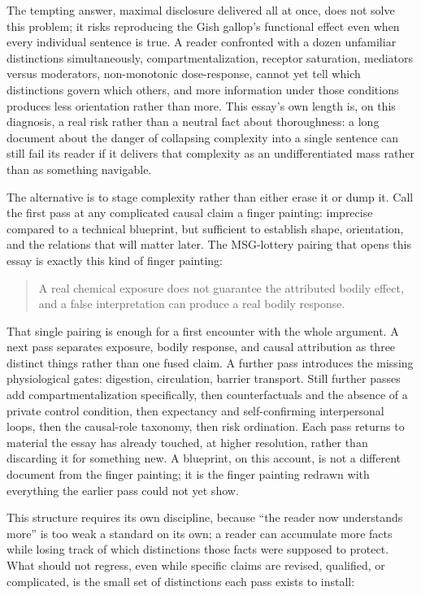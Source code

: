 \documentclass[11pt]{article}
\begin{document}
The tempting answer, maximal disclosure delivered all at once, does not solve this problem; it risks reproducing the Gish gallop's functional effect even when every individual sentence is true. A reader confronted with a dozen unfamiliar distinctions simultaneously, compartmentalization, receptor saturation, mediators versus moderators, non-monotonic dose-response, cannot yet tell which distinctions govern which others, and more information under those conditions produces less orientation rather than more. This essay's own length is, on this diagnosis, a real risk rather than a neutral fact about thoroughness: a long document about the danger of collapsing complexity into a single sentence can still fail its reader if it delivers that complexity as an undifferentiated mass rather than as something navigable.

The alternative is to stage complexity rather than either erase it or dump it. Call the first pass at any complicated causal claim a finger painting: imprecise compared to a technical blueprint, but sufficient to establish shape, orientation, and the relations that will matter later. The MSG-lottery pairing that opens this essay is exactly this kind of finger painting:

\begin{quote}
A real chemical exposure does not guarantee the attributed bodily effect, and a false interpretation can produce a real bodily response.
\end{quote}

That single pairing is enough for a first encounter with the whole argument. A next pass separates exposure, bodily response, and causal attribution as three distinct things rather than one fused claim. A further pass introduces the missing physiological gates: digestion, circulation, barrier transport. Still further passes add compartmentalization specifically, then counterfactuals and the absence of a private control condition, then expectancy and self-confirming interpersonal loops, then the causal-role taxonomy, then risk ordination. Each pass returns to material the essay has already touched, at higher resolution, rather than discarding it for something new. A blueprint, on this account, is not a different document from the finger painting; it is the finger painting redrawn with everything the earlier pass could not yet show.

This structure requires its own discipline, because ``the reader now understands more'' is too weak a standard on its own; a reader can accumulate more facts while losing track of which distinctions those facts were supposed to protect. What should not regress, even while specific claims are revised, qualified, or complicated, is the small set of distinctions each pass exists to install:
\end{document}
